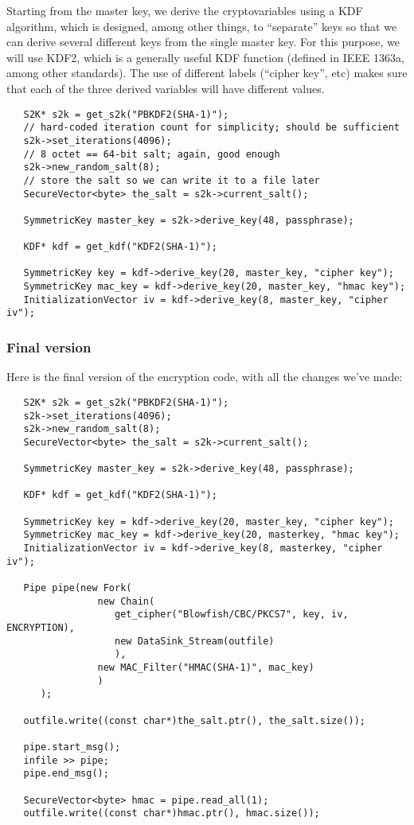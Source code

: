 \documentclass{article}
\begin{document}
Starting from the master key, we derive the cryptovariables using a KDF
algorithm, which is designed, among other things, to ``separate'' keys so that
we can derive several different keys from the single master key. For this
purpose, we will use KDF2, which is a generally useful KDF function (defined in
IEEE 1363a, among other standards). The use of different labels (``cipher
key'', etc) makes sure that each of the three derived variables will have
different values.

\begin{verbatim}
   S2K* s2k = get_s2k("PBKDF2(SHA-1)");
   // hard-coded iteration count for simplicity; should be sufficient
   s2k->set_iterations(4096);
   // 8 octet == 64-bit salt; again, good enough
   s2k->new_random_salt(8);
   // store the salt so we can write it to a file later
   SecureVector<byte> the_salt = s2k->current_salt();

   SymmetricKey master_key = s2k->derive_key(48, passphrase);

   KDF* kdf = get_kdf("KDF2(SHA-1)");

   SymmetricKey key = kdf->derive_key(20, master_key, "cipher key");
   SymmetricKey mac_key = kdf->derive_key(20, master_key, "hmac key");
   InitializationVector iv = kdf->derive_key(8, master_key, "cipher iv");
\end{verbatim}

\subsubsection{Final version}

Here is the final version of the encryption code, with all the changes we've
made:

\begin{verbatim}
   S2K* s2k = get_s2k("PBKDF2(SHA-1)");
   s2k->set_iterations(4096);
   s2k->new_random_salt(8);
   SecureVector<byte> the_salt = s2k->current_salt();

   SymmetricKey master_key = s2k->derive_key(48, passphrase);

   KDF* kdf = get_kdf("KDF2(SHA-1)");

   SymmetricKey key = kdf->derive_key(20, master_key, "cipher key");
   SymmetricKey mac_key = kdf->derive_key(20, masterkey, "hmac key");
   InitializationVector iv = kdf->derive_key(8, masterkey, "cipher iv");

   Pipe pipe(new Fork(
                new Chain(
                   get_cipher("Blowfish/CBC/PKCS7", key, iv, ENCRYPTION),
                   new DataSink_Stream(outfile)
                   ),
                new MAC_Filter("HMAC(SHA-1)", mac_key)
                )
      );

   outfile.write((const char*)the_salt.ptr(), the_salt.size());

   pipe.start_msg();
   infile >> pipe;
   pipe.end_msg();

   SecureVector<byte> hmac = pipe.read_all(1);
   outfile.write((const char*)hmac.ptr(), hmac.size());
\end{verbatim}
\end{document}
